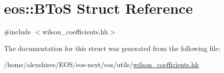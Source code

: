 \hypertarget{structeos_1_1BToS}{
\section{eos::BToS Struct Reference}
\label{structeos_1_1BToS}
}


{\ttfamily \#include $<$wilson\_\-coefficients.hh$>$}

The documentation for this struct was generated from the following file:\begin{DoxyCompactItemize}
\item 
/home/alexshires/EOS/eos-\/next/eos/utils/\hyperlink{wilson__coefficients_8hh}{wilson\_\-coefficients.hh}\end{DoxyCompactItemize}
